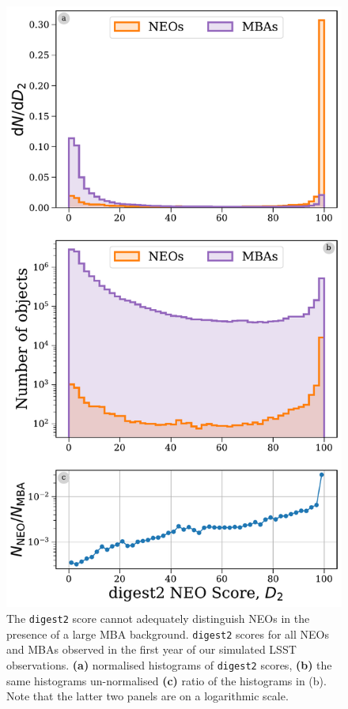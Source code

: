 \documentclass[twocolumn]{aastex631}
\newcommand{\dig}{\texttt{digest2}}
\begin{document}
\begin{figure}[htb]
    \centering
    \includegraphics[width=\columnwidth]{digest2_pollution.pdf}
    \caption{The \dig{} score cannot adequately distinguish NEOs in the presence of a large MBA background. \dig{} scores for all NEOs and MBAs observed in the first year of our simulated LSST observations. \textbf{(a)} normalised histograms of \dig{} scores, \textbf{(b)} the same histograms un-normalised \textbf{(c)} ratio of the histograms in (b). Note that the latter two panels are on a logarithmic scale.}
    \label{fig:digest2_example}
\end{figure}
\end{document}
